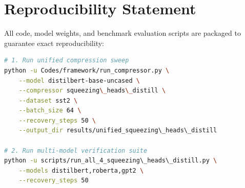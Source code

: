 \section{Reproducibility Statement}
All code, model weights, and benchmark evaluation scripts are packaged to guarantee exact reproducibility:
\begin{lstlisting}[language=bash]
# 1. Run unified compression sweep
python -u Codes/framework/run_compressor.py \
    --model distilbert-base-uncased \
    --compressor squeezing\_heads\_distill \
    --dataset sst2 \
    --batch_size 64 \
    --recovery_steps 50 \
    --output_dir results/unified_squeezing\_heads\_distill

# 2. Run multi-model verification suite
python -u scripts/run_all_4_squeezing\_heads\_distill.py \
    --models distilbert,roberta,gpt2 \
    --recovery_steps 50
\end{lstlisting}
